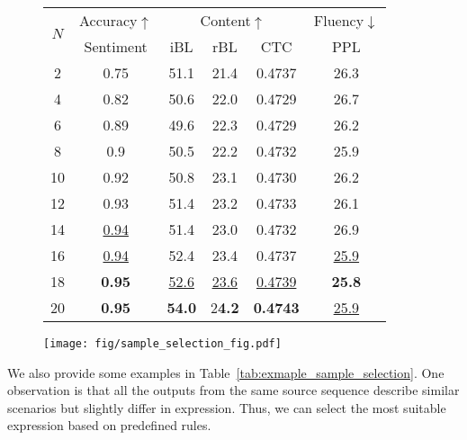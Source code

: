 \documentclass[11pt]{article}
\begin{document}
\begin{figure}[ht]
\begin{minipage}[ht]{0.5\textwidth}
\centering
\small
\begin{tabular}{cccccc}
\toprule


\multirow{2}{*}{$N$}&Accuracy$\uparrow$&\multicolumn{3}{c}{Content$\uparrow$}&Fluency$\downarrow$\\\cmidrule(r){2-2}\cmidrule(r){3-5}\cmidrule(r){6-6}
& Sentiment & iBL & rBL & CTC & PPL\\\midrule
2&0.75&51.1&21.4&0.4737&26.3\\
4&0.82&50.6&22.0&0.4729&26.7\\
6&0.89&49.6&22.3&0.4729&26.2\\
8&0.9&50.5&22.2&0.4732&25.9\\
10&0.92&50.8&23.1&0.4730&26.2\\
12&0.93&51.4&23.2&0.4733&26.1\\
14&\underline{0.94}&51.4&23.0&0.4732&26.9\\
16&\underline{0.94}&52.4&23.4&0.4737&\underline{25.9}\\
18&\textbf{0.95}&\underline{52.6}&\underline{23.6}&\underline{0.4739}&\textbf{25.8}\\
20&\textbf{0.95}&\textbf{54.0}&2\textbf{4.2}&\textbf{0.4743}&\underline{25.9}\\
\bottomrule
\end{tabular}
  \label{tab:sample_selection}
\end{minipage}
\hfill
\begin{minipage}[ht]{0.48\textwidth}
\centering
\texttt{[image: fig/sample\_selection\_fig.pdf]}
\label{fig:sample_selection}
\end{minipage}
\end{figure}
We also provide some examples in Table~\ref{tab:exmaple_sample_selection}. One observation is that all the outputs from the same source sequence describe similar scenarios but slightly differ in expression.
Thus, we can select the most suitable expression based on predefined rules. 
\end{document}
